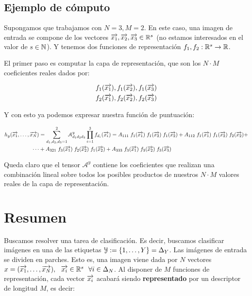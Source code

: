\subsection{Ejemplo de cómputo} \label{ejemplo:funcion_puntuacion}

Supongamos que trabajamos con $N = 3, M = 2$. En este caso, una imagen de entrada se compone de los vectores $\overrightarrow{x_1}, \overrightarrow{x_2}, \overrightarrow{x_3} \in \mathbb{R}^s$ (no estamos interesados en el valor de $s \in \mathbb{N}$). Y tenemos dos funciones de representación $f_1, f_2: \mathbb{R}^s \to \mathbb{R}$.

El primer paso es computar la capa de representación, que son los $N \cdot M$ coeficientes reales dados por:

\begin{equation}
	\begin{split}
		f_1(\overrightarrow{x_1}), f_1(\overrightarrow{x_2}), f_1(\overrightarrow{x_3}) \\
		f_2(\overrightarrow{x_1}), f_2(\overrightarrow{x_2}), f_2(\overrightarrow{x_3})
	\end{split}
\end{equation}

Y con esto ya podemos expresar nuestra función de puntuación:

\begin{equation}
	\begin{split}
		h_y(\overrightarrow{x_1}, \ldots, \overrightarrow{x_N}) &= \sum_{d_1, d_2, d_3 = 1}^{2} \mathcal{A}^y_{d_1 d_2 d_3} \prod_{i = 1}^3 f_{d_i}(\overrightarrow{x_i}) = A_{111} \; f_1(\overrightarrow{x_1}) \; f_1(\overrightarrow{x_2}) \; f_1(\overrightarrow{x_2}) + A_{112} \; f_1(\overrightarrow{x_1}) \; f_1(\overrightarrow{x_2}) \; f_2(\overrightarrow{x_2}) + \\
		\cdots &+ A_{321} \; f_3(\overrightarrow{x_1}) \; f_2(\overrightarrow{x_2}) \; f_1(\overrightarrow{x_2}) + A_{333} \; f_3(\overrightarrow{x_1}) \; f_3(\overrightarrow{x_2}) \; f_3(\overrightarrow{x_3})
	\end{split}
\end{equation}

Queda claro que el tensor $\mathcal{A}^y$ contiene los coeficientes que realizan una combinación lineal sobre todos los posibles productos de nuestros $N \cdot M$ valores reales de la capa de representación.

\section{Resumen}

Buscamos resolver una tarea de clasificación. Es decir, buscamos clasificar imágenes en una de las etiquetas $\mathcal{Y} := \{1, \ldots, Y\} = \Delta_{Y}$. Las imágenes de entrada se dividen en parches. Esto es, una imagen viene dada por $N$ vectores $x = (\overrightarrow{x_1}, \ldots, \overrightarrow{x_N}), \ \  \overrightarrow{x_i} \in \mathbb{R}^s \ \  \forall i \in \Delta_{N}$. Al disponer de $M$ funciones de representación, cada vector $\overrightarrow{x_i}$ acabará siendo \textbf{representado} por un descriptor de longitud $M$, es decir:


